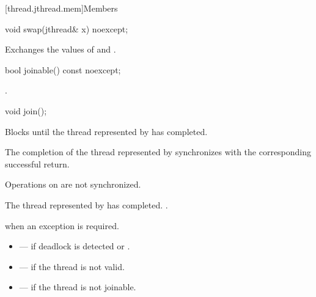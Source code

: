 [thread.jthread.mem]{Members}

%
\begin{itemdecl}
void swap(jthread& x) noexcept;
\end{itemdecl}

\begin{itemdescr}
\pnum
\effects
Exchanges the values of  and .
\end{itemdescr}

%
\begin{itemdecl}
bool joinable() const noexcept;
\end{itemdecl}

\begin{itemdescr}
\pnum
\returns
{}.
\end{itemdescr}

%
\begin{itemdecl}
void join();
\end{itemdecl}

\begin{itemdescr}
\pnum
{}%
\effects
Blocks until the thread represented by  has completed.

\pnum
\sync
The completion of the thread represented by 
synchronizes with
the corresponding successful  return.
\begin{note}
Operations on  are not synchronized.
\end{note}

\pnum
\ensures
The thread represented by  has completed.
.

\pnum
\throws
{} when an exception is required.

\pnum
\errors
\begin{itemize}
\item {} --- if deadlock is detected or
.

\item {} --- if the thread is not valid.

\item {} --- if the thread is not joinable.
\end{itemize}
\end{itemdescr}

